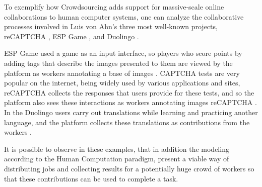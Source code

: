 To exemplify how Crowdsourcing adds support for massive-scale online collaborations to human computer systems, one can analyze the collaborative processes involved in Luis von Ahn's three most well-known projects,  reCAPTCHA \cite{Simmons:2010:PLV:1869086.1869102},  ESP Game \cite{Robertson:2009:REG:1520340.1520597}, and  Duolingo \cite{vonAhn:2011:THC}.

ESP Game used a game as an input interface, so players who score points by adding tags that describe the images presented to them are viewed by the platform as workers annotating a base of images \cite{Robertson:2009:REG:1520340.1520597}. CAPTCHA tests are very popular on the internet, being widely used by various applications and sites, reCAPTCHA collects the responses that users provide for these tests, and so the platform also sees these interactions as workers annotating images reCAPTCHA \cite{Simmons:2010:PLV:1869086.1869102}. In the Duolingo users carry out translations while learning and practicing another language, and the platform collects these translations as contributions from the workers \cite{Abaunza:2016:BRW:3012430.3012522}.

It is possible to observe in these examples, that in addition the modeling according to the Human Computation paradigm, present a viable way of distributing jobs and collecting results for a potentially huge crowd of workers so that these contributions can be used to complete a task.


